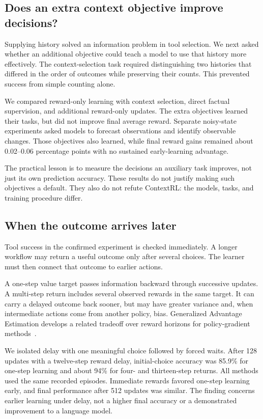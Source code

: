 \documentclass{strategynet-journal}
\begin{document}
\begin{SNcolumns}
\subsection{Does an extra context objective improve decisions?}

Supplying history solved an information problem in tool selection. We next
asked whether an additional objective could teach a model to use that history
more effectively. The context-selection task required distinguishing two
histories that differed in the order of outcomes while preserving their
counts. This prevented success from simple counting alone.

We compared reward-only learning with context selection, direct factual
supervision, and additional reward-only updates. The extra objectives learned
their tasks, but did not improve final average reward. Separate noisy-state
experiments asked models to forecast observations and identify observable
changes. Those objectives also learned, while final reward gains remained
about 0.02--0.06 percentage points with no sustained early-learning advantage.

The practical lesson is to measure the decisions an auxiliary task improves,
not just its own prediction accuracy. These results do not justify making
such objectives a default. They also do not refute ContextRL: the models,
tasks, and training procedure differ.

\subsection{When the outcome arrives later}

Tool success in the confirmed experiment is checked immediately. A longer
workflow may return a useful outcome only after several choices. The learner
must then connect that outcome to earlier actions.

A one-step value target passes information backward through successive
updates. A multi-step return includes several observed rewards in the same
target. It can carry a delayed outcome back sooner, but may have greater
variance and, when intermediate actions come from another policy, bias.
Generalized Advantage Estimation develops a related tradeoff over reward
horizons for policy-gradient methods~\cite{gae}.

We isolated delay with one meaningful choice followed by forced waits. After
128 updates with a twelve-step reward delay, initial-choice accuracy was
85.9\% for one-step learning and about 94\% for four- and thirteen-step returns.
All methods used the same recorded episodes. Immediate rewards favored
one-step learning early, and final performance after 512 updates was similar.
The finding concerns earlier learning under delay, not a higher final accuracy
or a demonstrated improvement to a language model.
\end{SNcolumns}
\end{document}
